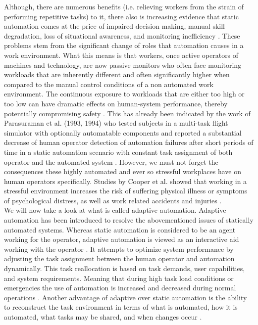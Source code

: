 Although, there are numerous benefits (i.e. relieving workers from the strain of performing repetitive tasks) to it, there also is increasing evidence that static automation comes at the price of impaired decision making, manual skill degradation, loss of situational awareness, and monitoring inefficiency \cite{Byrne1996}.
These problems stem from the significant change of roles that automation causes in a work environment. What this means is that workers, once active operators of machines and technology, are now passive monitors who often face monitoring workloads that are inherently different and often significantly higher when compared to the manual control conditions of a non automated work environment. The continuous exposure to workloads that are either too high or too low can have dramatic effects on human-system performance, thereby potentially compromising safety \cite{Mehta2013}. This has already been indicated by the work of Parasuraman et al. (1993, 1994) who tested subjects in a multi-task flight simulator with optionally automatable components and reported a substantial decrease of human operator detection of automation failures after short periods of time in a static automation scenario with constant task assignment of both operator and the automated system \cite{Byrne1996}.
However, we must not forget the consequences these highly automated and ever so stressful workplaces have on human operators specifically. Studies by Cooper et al. showed that working in a stressful environment increases the risk of suffering physical illness or symptoms of psychological distress, as well as work related accidents and injuries \cite{Clarke2004}.\\
We will now take a look at what is called adaptive automation. Adaptive automation has been introduced to resolve the abovementioned issues of statically automated systems.
Whereas static automation is considered to be an agent working for the operator, adaptive automation is viewed as an interactive aid working with the operator \cite{Byrne1996}. It attempts to optimize system performance by adjusting the task assignment between the human operator and automation dynamically. This task reallocation is based on task demands, user capabilities, and system requirements. Meaning that during high task load conditions or emergencies the use of automation is increased and decreased during normal operations \cite{Mehta2013}.
Another advantage of adaptive over static automation is the ability to reconstruct the task environment in terms of what is automated, how it is automated, what tasks may be shared, and when changes occur \cite{Byrne1996}. 
